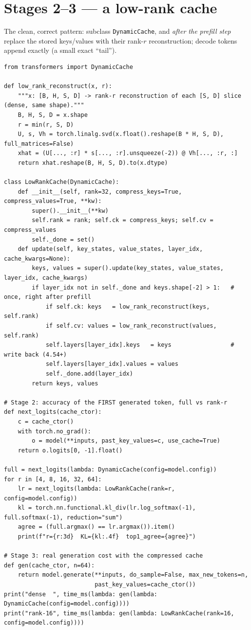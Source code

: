 \documentclass[11pt]{article}
\newcommand{\code}[1]{\texttt{\small #1}}
\begin{document}
\section{Stages 2--3 --- a low-rank cache}
The clean, correct pattern: subclass \code{DynamicCache}, and \emph{after the prefill step}
replace the stored keys/values with their rank-$r$ reconstruction; decode tokens append exactly
(a small exact ``tail'').

\begin{lstlisting}
from transformers import DynamicCache

def low_rank_reconstruct(x, r):
    """x: [B, H, S, D] -> rank-r reconstruction of each [S, D] slice (dense, same shape)."""
    B, H, S, D = x.shape
    r = min(r, S, D)
    U, s, Vh = torch.linalg.svd(x.float().reshape(B * H, S, D), full_matrices=False)
    xhat = (U[..., :r] * s[..., :r].unsqueeze(-2)) @ Vh[..., :r, :]
    return xhat.reshape(B, H, S, D).to(x.dtype)

class LowRankCache(DynamicCache):
    def __init__(self, rank=32, compress_keys=True, compress_values=True, **kw):
        super().__init__(**kw)
        self.rank = rank; self.ck = compress_keys; self.cv = compress_values
        self._done = set()
    def update(self, key_states, value_states, layer_idx, cache_kwargs=None):
        keys, values = super().update(key_states, value_states, layer_idx, cache_kwargs)
        if layer_idx not in self._done and keys.shape[-2] > 1:   # once, right after prefill
            if self.ck: keys   = low_rank_reconstruct(keys,   self.rank)
            if self.cv: values = low_rank_reconstruct(values, self.rank)
            self.layers[layer_idx].keys   = keys                 # write back (4.54+)
            self.layers[layer_idx].values = values
            self._done.add(layer_idx)
        return keys, values

# Stage 2: accuracy of the FIRST generated token, full vs rank-r
def next_logits(cache_ctor):
    c = cache_ctor()
    with torch.no_grad():
        o = model(**inputs, past_key_values=c, use_cache=True)
    return o.logits[0, -1].float()

full = next_logits(lambda: DynamicCache(config=model.config))
for r in [4, 8, 16, 32, 64]:
    lr = next_logits(lambda: LowRankCache(rank=r, config=model.config))
    kl = torch.nn.functional.kl_div(lr.log_softmax(-1), full.softmax(-1), reduction="sum")
    agree = (full.argmax() == lr.argmax()).item()
    print(f"r={r:3d}  KL={kl:.4f}  top1_agree={agree}")

# Stage 3: real generation cost with the compressed cache
def gen(cache_ctor, n=64):
    return model.generate(**inputs, do_sample=False, max_new_tokens=n,
                          past_key_values=cache_ctor())
print("dense  ", time_ms(lambda: gen(lambda: DynamicCache(config=model.config))))
print("rank-16", time_ms(lambda: gen(lambda: LowRankCache(rank=16, config=model.config))))
\end{lstlisting}
\end{document}
